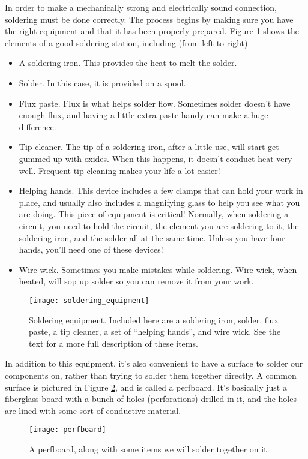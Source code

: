 In order to make a mechanically strong and electrically sound connection, 
soldering must be done correctly. The process begins by making sure you have
the right equipment and that it has been properly prepared. Figure
\ref{fig:soldering_equipment} shows the elements of a good soldering station, 
including (from left to right)
\begin{itemize}
\item A soldering iron. This provides the heat to melt the solder.
\item Solder. In this case, it is provided on a spool.
\item Flux paste. Flux is what helps solder flow. Sometimes solder doesn't
have enough flux, and having a little extra paste handy can make a huge 
difference.
\item Tip cleaner. The tip of a soldering iron, after a little use, will start
get gummed up with oxides. When this happens, it doesn't conduct heat very well.
Frequent tip cleaning makes your life a lot easier!
\item Helping hands. This device includes a few clamps that can hold your work
in place, and usually also includes a magnifying glass to help you see what
you are doing. This piece of equipment is critical! Normally, when soldering a
circuit, you need to hold the circuit, the element you are soldering to it, 
the soldering iron, and the solder all at the same time. Unless you have four
hands, you'll need one of these devices!
\item Wire wick. Sometimes you make mistakes while soldering. Wire wick, when 
heated, will sop up solder so you can remove it from your work.
\end{itemize}
\begin{figure}[htbp!]
\centering
\texttt{[image: soldering\_equipment]}
\caption[Soldering equipment]{Soldering equipment. Included here are
a soldering iron, solder, flux paste, a tip cleaner, a set of ``helping
hands'', and wire wick. See the text for a more full description of these
items.}
\label{fig:soldering_equipment}
\end{figure}

In addition to this equipment, it's also convenient to have a surface to 
solder our components on, rather than trying to solder them together directly.
A common surface is pictured in Figure \ref{fig:perfboard}, and is called a
perfboard. It's basically just a fiberglass board with a bunch of holes
(perforations) drilled in it, and the holes are lined with some sort of 
conductive material.
\begin{figure}[htbp!]
\centering
\texttt{[image: perfboard]}
\caption[A perfboard]{A perfboard, along with some items we will solder
together on it.}
\label{fig:perfboard}
\end{figure}

